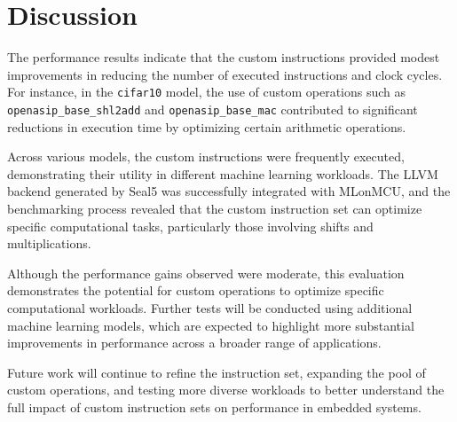\section{Discussion}

The performance results indicate that the custom instructions provided modest improvements in reducing the number of executed instructions and clock cycles. For instance, in the \texttt{cifar10} model, the use of custom operations such as \texttt{openasip\_base\_shl2add} and \texttt{openasip\_base\_mac} contributed to significant reductions in execution time by optimizing certain arithmetic operations.

Across various models, the custom instructions were frequently executed, demonstrating their utility in different machine learning workloads. The LLVM backend generated by Seal5 was successfully integrated with MLonMCU, and the benchmarking process revealed that the custom instruction set can optimize specific computational tasks, particularly those involving shifts and multiplications.

Although the performance gains observed were moderate, this evaluation demonstrates the potential for custom operations to optimize specific computational workloads. Further tests will be conducted using additional machine learning models, which are expected to highlight more substantial improvements in performance across a broader range of applications.

Future work will continue to refine the instruction set, expanding the pool of custom operations, and testing more diverse workloads to better understand the full impact of custom instruction sets on performance in embedded systems.
